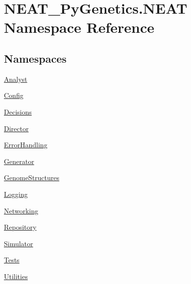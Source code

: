\hypertarget{namespaceNEAT__PyGenetics_1_1NEAT}{}\section{N\+E\+A\+T\+\_\+\+Py\+Genetics.\+N\+E\+AT Namespace Reference}
\label{namespaceNEAT__PyGenetics_1_1NEAT}
\subsection*{Namespaces}
\begin{DoxyCompactItemize}
\item 
 \hyperlink{namespaceNEAT__PyGenetics_1_1NEAT_1_1Analyst}{Analyst}
\item 
 \hyperlink{namespaceNEAT__PyGenetics_1_1NEAT_1_1Config}{Config}
\item 
 \hyperlink{namespaceNEAT__PyGenetics_1_1NEAT_1_1Decisions}{Decisions}
\item 
 \hyperlink{namespaceNEAT__PyGenetics_1_1NEAT_1_1Director}{Director}
\item 
 \hyperlink{namespaceNEAT__PyGenetics_1_1NEAT_1_1ErrorHandling}{Error\+Handling}
\item 
 \hyperlink{namespaceNEAT__PyGenetics_1_1NEAT_1_1Generator}{Generator}
\item 
 \hyperlink{namespaceNEAT__PyGenetics_1_1NEAT_1_1GenomeStructures}{Genome\+Structures}
\item 
 \hyperlink{namespaceNEAT__PyGenetics_1_1NEAT_1_1Logging}{Logging}
\item 
 \hyperlink{namespaceNEAT__PyGenetics_1_1NEAT_1_1Networking}{Networking}
\item 
 \hyperlink{namespaceNEAT__PyGenetics_1_1NEAT_1_1Repository}{Repository}
\item 
 \hyperlink{namespaceNEAT__PyGenetics_1_1NEAT_1_1Simulator}{Simulator}
\item 
 \hyperlink{namespaceNEAT__PyGenetics_1_1NEAT_1_1Tests}{Tests}
\item 
 \hyperlink{namespaceNEAT__PyGenetics_1_1NEAT_1_1Utilities}{Utilities}
\end{DoxyCompactItemize}
